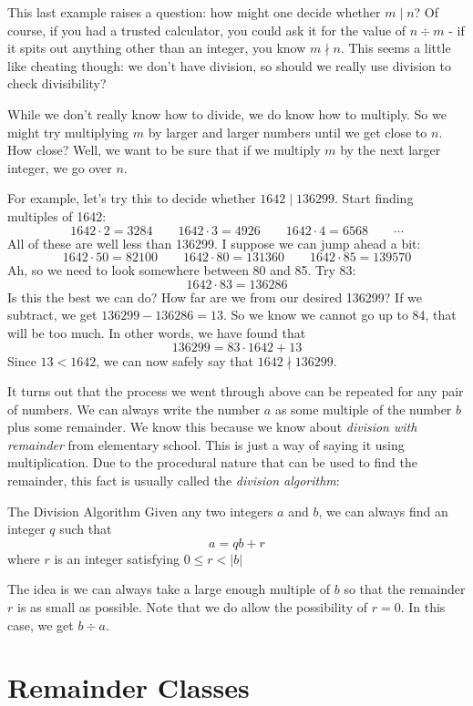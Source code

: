 \documentclass[12pt]{article}
\begin{document}
This last example raises a question: how might one decide whether $m \mid n$?  Of course, if you had a trusted calculator, you could ask it for the value of $n \div m$ - if it spits out anything other than an integer, you know $m \nmid n$.  This seems a little like cheating though: we don't have division, so should we really use division to check divisibility?

While we don't really know how to divide, we do know how to multiply.  So we might try multiplying $m$ by larger and larger numbers until we get close to $n$.  How close?  Well, we want to be sure that if we multiply $m$ by the next larger integer, we go over $n$.  

For example, let's try this to decide whether $1642 \mid 136299$.  Start finding multiples of 1642:
\[1642 \cdot 2 = 3284 \qquad 1642 \cdot 3 = 4926 \qquad 1642\cdot 4 = 6568 \qquad \cdots\]
All of these are well less than 136299.  I suppose we can jump ahead a bit:
\[1642 \cdot 50 = 82100 \qquad 1642 \cdot 80 = 131360 \qquad 1642 \cdot 85 = 139570\]
Ah, so we need to look somewhere between 80 and 85.  Try 83:
\[1642 \cdot 83 = 136286\]
Is this the best we can do?  How far are we from our desired 136299?  If we subtract, we get $136299 - 136286 = 13$.  So we know we cannot go up to 84, that will be too much.  In other words, we have found that
\[136299 = 83 \cdot 1642 + 13\]
Since $13 < 1642$, we can now safely say that $1642 \nmid 136299$.

It turns out that the process we went through above can be repeated for any pair of numbers.  We can always write the number $a$ as some multiple of the number $b$ plus some remainder.  We know this because we know about {\em division with remainder} from elementary school.  This is just a way of saying it using multiplication.  Due to the procedural nature that can be used to find the remainder, this fact is usually called the {\em division algorithm}:

\begin{defbox}{The Division Algorithm}
	Given any two integers $a$ and $b$, we can always find an integer $q$ such that 
	\[a = qb + r\]
	where $r$ is an integer satisfying $0 \le r < |b|$
\end{defbox}

The idea is we can always take a large enough multiple of $b$ so that the remainder $r$ is as small as possible.  Note that we do allow the possibility of $r = 0$.  In this case, we get $b \div a$.


\section{Remainder Classes}
\end{document}

